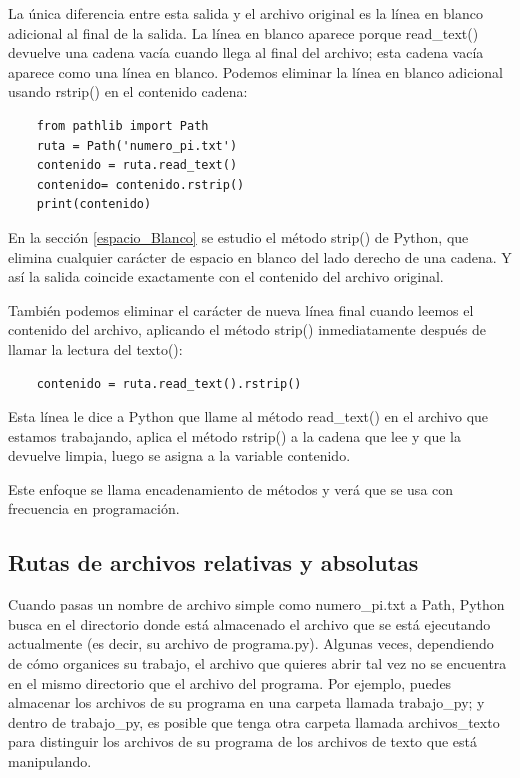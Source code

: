 La única diferencia entre esta salida y el archivo original es la
línea en blanco adicional al final de la salida. La línea en blanco aparece porque
{\ttfamily read\_text()} devuelve una cadena vacía cuando llega al final del archivo; esta cadena vacía aparece como una línea en blanco. Podemos eliminar la línea en blanco adicional usando {\ttfamily rstrip()} en el contenido
cadena:
\begin{lstlisting}
	from pathlib import Path
	ruta = Path('numero_pi.txt')
	contenido = ruta.read_text()
	contenido= contenido.rstrip()
	print(contenido)
\end{lstlisting}

En la sección \ref{espacio_Blanco} se estudio el método {\ttfamily strip()} de Python, que elimina
cualquier carácter de espacio en blanco del lado derecho de una cadena. Y así la salida
coincide exactamente con el contenido del archivo original.


También podemos eliminar el carácter de nueva línea final cuando leemos el contenido del archivo, aplicando el método {\ttfamily strip()}  inmediatamente después de llamar la lectura del texto():

\begin{lstlisting}
	contenido = ruta.read_text().rstrip()
\end{lstlisting}

Esta línea le dice a Python que llame al método {\ttfamily read\_text()} en el archivo que estamos
trabajando,  aplica el método {\ttfamily  rstrip()} a la cadena que lee y que  la  devuelve limpia, luego se asigna a la variable contenido.

Este enfoque se llama encadenamiento de métodos y verá que se usa con frecuencia
en programación.



\subsection{Rutas de archivos relativas y absolutas}

Cuando pasas un nombre de archivo simple como {\ttfamily numero\_pi.txt}  a  {\ttfamily Path}, Python busca en el directorio donde está almacenado el archivo que se está ejecutando actualmente (es decir, su archivo de programa.py).
Algunas veces, dependiendo de cómo organices su trabajo, el archivo que quieres abrir tal vez no se encuentra en el mismo directorio que el archivo del programa. Por ejemplo, puedes almacenar los archivos de su programa en una carpeta llamada {\ttfamily trabajo\_py}; y dentro de {\ttfamily trabajo\_py}, es posible que tenga otra carpeta llamada {\ttfamily archivos\_texto} para distinguir los archivos de su programa de los archivos de texto que está manipulando. 

